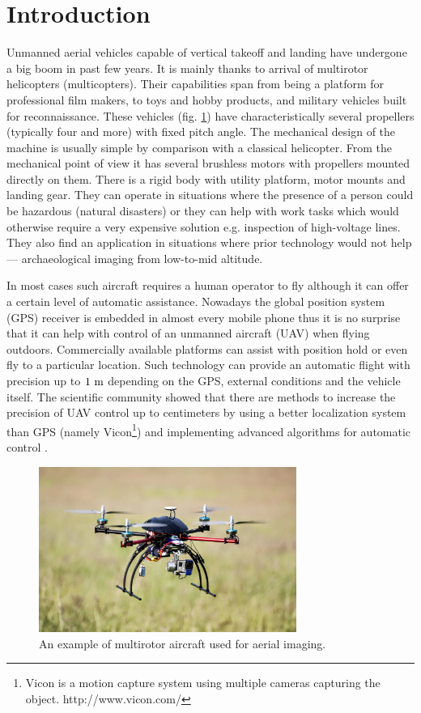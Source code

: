 \section{Introduction}

Unmanned aerial vehicles capable of vertical takeoff and landing have undergone a big boom in past few years. It is mainly thanks to arrival of multirotor helicopters (multicopters). Their capabilities span from being a platform for professional film makers, to toys and hobby products, and military vehicles built for reconnaissance. These vehicles (fig. \ref{fig:quadru1}) have characteristically several propellers (typically four and more) with fixed pitch angle. The mechanical design of the machine is usually simple by comparison with a classical helicopter. From the mechanical point of view it has several brushless motors with propellers mounted directly on them. There is a rigid body with utility platform, motor mounts and landing gear. They can operate in situations where the presence of a person could be hazardous (natural disasters) or they can help with work tasks which would otherwise require a very expensive solution e.g. inspection of high-voltage lines. They also find an application in situations where prior technology would not help --- archaeological imaging from low-to-mid altitude.

In most cases such aircraft requires a human operator to fly although it can offer a certain level of automatic assistance. Nowadays the global position system (GPS) receiver is embedded in almost every mobile phone thus it is no surprise that it can help with control of an unmanned aircraft (UAV) when flying outdoors. Commercially available platforms can assist with position hold or even fly to a particular location. Such technology can provide an automatic flight with precision up to $1 ~\mathrm{m}$ depending on the GPS, external conditions and the vehicle itself. The scientific community showed that there are methods to increase the precision of UAV control up to centimeters by using a better localization system than GPS (namely Vicon\footnote{Vicon is a motion capture system using multiple cameras capturing the object. http://www.vicon.com/}) and implementing advanced algorithms for automatic control \citep{brescianini2013polearobatics, kumar2010grasp}.

\begin{figure}[h]
\centering
\includegraphics[width=0.75\textwidth]{fig/quadru1.jpg}
\caption{An example of multirotor aircraft used for aerial imaging.}
\label{fig:quadru1}
\end{figure}

